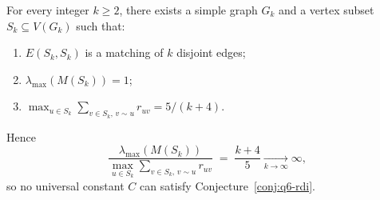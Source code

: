 \begin{proposition}\label{prop:q6-rdi-false}
For every integer $k\ge 2$, there exists a simple graph $G_k$ and a
vertex subset $S_k\subseteq V(G_k)$ such that:
\begin{enumerate}[nosep]
\item $E(S_k,S_k)$ is a matching of $k$ disjoint edges;
\item $\lambda_{\max}(M(S_k))=1$;
\item $\max_{u\in S_k}\sum_{v\in S_k,\,v\sim u} r_{uv}=5/(k+4)$.
\end{enumerate}
Hence
\[
\frac{\lambda_{\max}(M(S_k))}
{\max_{u\in S_k}\sum_{v\in S_k,\,v\sim u} r_{uv}}
\;=\;\frac{k+4}{5}\xrightarrow[k\to\infty]{}\infty,
\]
so no universal constant $C$ can satisfy
Conjecture~\ref{conj:q6-rdi}.
\end{proposition}


